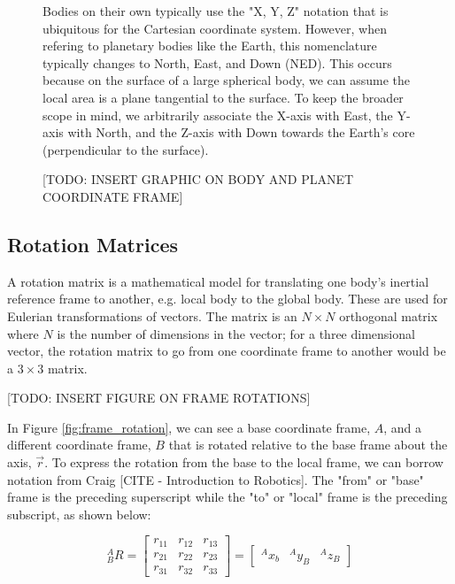 \begin{figure}
    \begin{fitbox}[frametitle=Aside: Notation and Nomenclature for Rotations]
        Bodies on their own typically use the "X, Y, Z" notation that is ubiquitous for the Cartesian coordinate system.
        However, when refering to planetary bodies like the Earth, this nomenclature typically changes to North, East, and Down (NED).
        This occurs because on the surface of a large spherical body, we can assume the local area is a plane tangential to the surface.
        To keep the broader scope in mind, we arbitrarily associate the X-axis with East, the Y-axis with North, and the Z-axis with Down towards the Earth's core (perpendicular to the surface).

        [TODO: INSERT GRAPHIC ON BODY AND PLANET COORDINATE FRAME]
    \end{fitbox}
\end{figure}

\subsection{Rotation Matrices}
A rotation matrix is a mathematical model for translating one body's inertial reference frame to another, e.g. local body to the global body.
These are used for Eulerian transformations of vectors.
The matrix is an $N \times N$ orthogonal matrix where $N$ is the number of dimensions in the vector;
for a three dimensional vector, the rotation matrix to go from one coordinate frame to another would be a $3 \times 3$ matrix.

[TODO: INSERT FIGURE ON FRAME ROTATIONS]

In Figure \ref{fig:frame_rotation}, we can see a base coordinate frame, $A$, and a different coordinate frame, $B$ that is rotated relative to the base frame about the axis, $\vec{r}$.
To express the rotation from the base to the local frame, we can borrow notation from Craig [CITE - Introduction to Robotics].
The "from" or "base" frame is the preceding superscript while the "to" or "local" frame is the preceding subscript, as shown below:

\begin{equation*}
    {}^A_B R = \left[
        \begin{matrix}
            r_{11} & r_{12} & r_{13} \\
            r_{21} & r_{22} & r_{23} \\
            r_{31} & r_{32} & r_{33}
        \end{matrix}
    \right] = \left[
        \begin{matrix}
            {}^Ax_b & {}^Ay_B & {}^Az_B
        \end{matrix}\right]
\end{equation*}

